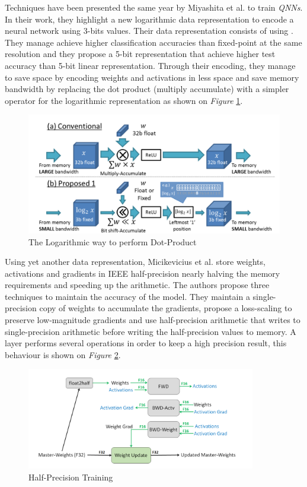 Techniques have been presented the same year by Miyashita et al. \cite{Miyashita2016} to train \emph{QNNs}. In their work, they highlight a new logarithmic data representation to encode a neural network using 3-bits values. Their data representation consists of using . They manage achieve higher classification accuracies than fixed-point at the same resolution and they propose a 5-bit representation that achieve higher test accuracy than 5-bit linear representation. Through their encoding, they manage to save space by encoding weights and activations in less space and save memory bandwidth by replacing the dot product (multiply accumulate) with a simpler operator for the logarithmic representation as shown on \emph{Figure} \ref{fig:DotProdLog}.

\begin{figure}[htbp]
	\centering
		\includegraphics[width=12cm]{Figures/DotProdLog.png}
	\caption[Logarithmic Dot Product]{The Logarithmic way to perform Dot-Product \cite{Miyashita2016}}
	\label{fig:DotProdLog}
\end{figure}

Using yet another data representation, Micikevicius et al. \cite{Micikevicius2017} store weights, activations and gradients in IEEE half-precision nearly halving the memory requirements and speeding up the arithmetic. The authors propose three techniques to maintain the accuracy of the model. They maintain a single-precision copy of weights to accumulate the gradients, propose a loss-scaling to preserve low-magnitude gradients and use half-precision arithmetic that writes to single-precision arithmetic before writing the half-precision values to memory. A layer performs several operations in order to keep a high precision result, this behaviour is shown on \emph{Figure} \ref{fig:HPTraining}.

\begin{figure}[htbp]
	\centering
		\includegraphics[width=10cm]{Figures/HPTraining.png}
	\caption[HPTraining]{Half-Precision Training  \cite{Micikevicius2017}}
	\label{fig:HPTraining}
\end{figure}

